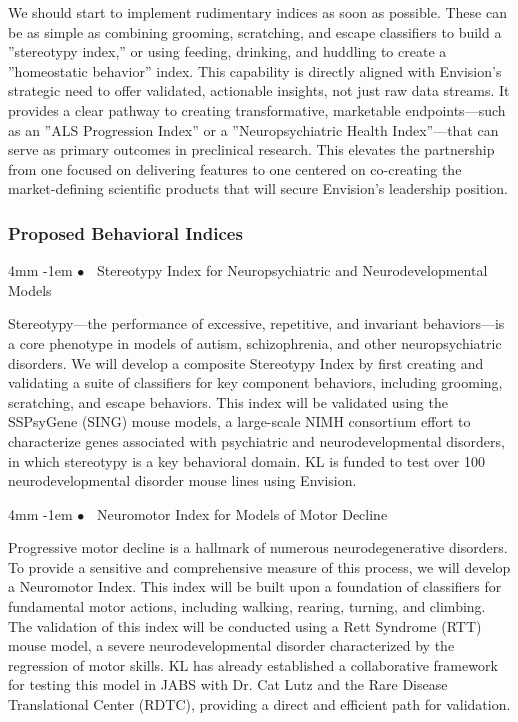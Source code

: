 \documentclass[11pt,a4paper]{article}
\makeatletter
\renewcommand\paragraph{%
  \@startsection{paragraph}{4}{\z@}%
    {4mm}%
    {-1em}%
    {\normalfont\normalsize\bfseries$\bullet$~}%
}
\makeatother
\begin{document}
We should start to implement rudimentary indices as soon as possible. These can be as simple as combining grooming, scratching, and escape classifiers to build a ”stereotypy index,” or using feeding, drinking, and huddling to create a ”homeostatic behavior” index. This capability is directly aligned with Envision’s strategic need to offer validated, actionable insights, not just raw data streams. It provides a clear pathway to creating transformative, marketable endpoints—such as an ”ALS Progression Index” or a ”Neuropsychiatric Health Index”—that can serve as primary outcomes in preclinical research. This elevates the partnership from one focused on delivering features to one centered on co-creating the market-defining scientific products that will secure Envision’s leadership position.

\subsubsection{Proposed Behavioral Indices}

\paragraph{Stereotypy Index for Neuropsychiatric and Neurodevelopmental Models}

Stereotypy—the performance of excessive, repetitive, and invariant behaviors—is a core phenotype in models of autism, schizophrenia, and other neuropsychiatric disorders. We will develop a composite Stereotypy Index by first creating and validating a suite of classifiers for key component behaviors, including grooming, scratching, and escape behaviors. This index will be validated using the SSPsyGene (SING) mouse models, a large-scale NIMH consortium effort to characterize genes associated with psychiatric and neurodevelopmental disorders, in which stereotypy is a key behavioral domain. KL is funded to test over 100 neurodevelopmental disorder mouse lines using Envision.

\paragraph{Neuromotor Index for Models of Motor Decline}

Progressive motor decline is a hallmark of numerous neurodegenerative disorders. To provide a sensitive and comprehensive measure of this process, we will develop a Neuromotor Index. This index will be built upon a foundation of classifiers for fundamental motor actions, including walking, rearing, turning, and climbing. The validation of this index will be conducted using a Rett Syndrome (RTT) mouse model, a severe neurodevelopmental disorder characterized by the regression of motor skills. KL has already established a collaborative framework for testing this model in JABS with Dr. Cat Lutz and the Rare Disease Translational Center (RDTC), providing a direct and efficient path for validation.
\end{document}
